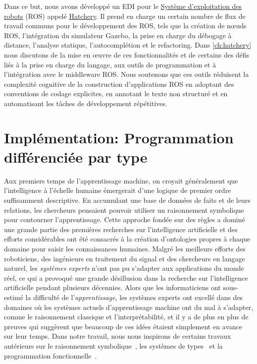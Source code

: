 Dans ce but, nous avons développé un EDI pour le \href{https://www.ros.org/}{Système d'exploitation des robots} (ROS) appelé \href{https://github.com/duckietown/hatchery}{Hatchery}. Il prend en charge un certain nombre de flux de travail communs pour le développement des ROS, tels que la création de nœuds ROS, l'intégration du simulateur Gazebo, la prise en charge du débogage à distance, l'analyse statique, l'autocomplétion et le refactoring. Dans \autoref{ch:hatchery} nous discutons de la mise en œuvre de ces fonctionnalités et de certains des défis liés à la prise en charge du langage, aux outils de programmation et à l'intégration avec le middleware ROS. Nous soutenons que ces outils réduisent la complexité cognitive de la construction d'applications ROS en adoptant des conventions de codage explicites, en annotant le texte non structuré et en automatisant les tâches de développement répétitives.

\section{Implémentation: Programmation différenciée par type}

Aux premiers temps de l'apprentissage machine, on croyait généralement que l'intelligence à l'échelle humaine émergerait d'une logique de premier ordre suffisamment descriptive. En accumulant une base de données de faits et de leurs relations, les chercheurs pensaient pouvoir utiliser un raisonnement symbolique pour contourner l'apprentissage. Cette approche fondée sur des règles a dominé une grande partie des premières recherches sur l'intelligence artificielle et des efforts considérables ont été consacrés à la création d'ontologies propres à chaque domaine pour saisir les connaissances humaines. Malgré les meilleurs efforts des roboticiens, des ingénieurs en traitement du signal et des chercheurs en langage naturel, les \textit{systèmes experts} n'ont pas pu s'adapter aux applications du monde réel, ce qui a provoqué une grande désillusion dans la recherche sur l'intelligence artificielle pendant plusieurs décennies. Alors que les informaticiens ont sous-estimé la difficulté de l'\textit{apprentissage}, les systèmes experts ont excellé dans des domaines où les systèmes actuels d'apprentissage machine ont du mal à s'adapter, comme le raisonnement classique et l'interprétabilité, et il y a de plus en plus de preuves qui suggèrent que beaucoup de ces idées étaient simplement en avance sur leur temps. Dans notre travail, nous nous inspirons de certains travaux antérieurs sur le raisonnement symbolique~\citep{dwyer1948symbolic, glushkov1971analitik}, les systèmes de types~\citep{lof1973intuitionistic,jay1996shape} et la programmation fonctionnelle~\citep{mccarthy1960recursive, abelson1996structure}.


